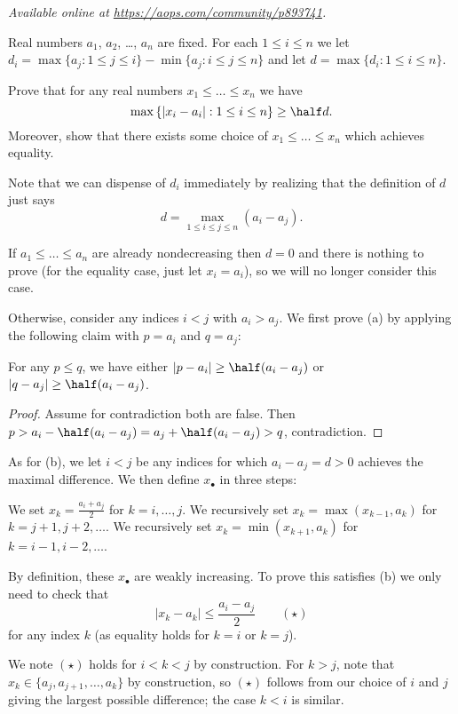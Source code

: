 \textsl{Available online at \url{https://aops.com/community/p893741}.}
\begin{mdframed}[style=mdpurplebox,frametitle={Problem statement}]
Real numbers $a_1$, $a_2$, \dots, $a_n$ are fixed.
For each $1 \le i \le n$ we let
$d_i = \max\{a_j : 1 \le j \le i\} - \min\{a_j : i \le j \le n\}$
and let $d = \max \{d_i : 1 \le i \le n\}$.

\begin{enumerate}[(a)]
  \ii Prove that for any real numbers $x_1 \le \dots \le x_n$ we have
  \[
    \max \left\{ \left\lvert x_i - a_i \right\rvert :
      1 \le i \le n \right\}
      \ge \half d.
  \]
  \ii Moreover, show that there exists some
  choice of $x_1 \le \dots \le x_n$ which achieves equality.
\end{enumerate}
\end{mdframed}
Note that we can dispense of $d_i$ immediately
by realizing that the definition of $d$ just says
\[ d = \max_{1 \le i \le j \le n} \left( a_i - a_j \right). \]

If $a_1 \le \dots \le a_n$ are already nondecreasing
then $d = 0$ and there is nothing to prove
(for the equality case, just let $x_i = a_i$),
so we will no longer consider this case.

Otherwise, consider any indices $i < j$ with $a_i > a_j$.
We first prove (a) by applying the following claim
with $p = a_i$ and $q = a_j$:
\begin{claim*}
  For any $p \le q$, we have
  either $|p - a_i| \ge \half(a_i-a_j)$
  or $|q - a_j| \ge \half(a_i-a_j)$.
\end{claim*}
\begin{proof}
  Assume for contradiction both are false.
  Then $p > a_i - \half(a_i-a_j)
  = a_j + \half(a_i-a_j) > q$, contradiction.
\end{proof}

As for (b), we let $i < j$ be any indices for which
$a_i - a_j = d > 0$ achieves the maximal difference.
We then define $x_\bullet$ in three steps:
\begin{itemize}
  \ii We set $x_k = \frac{a_i + a_j}{2}$ for $k = i, \dots, j$.
  \ii We recursively set $x_{k} = \max(x_{k-1}, a_k)$
  for $k = j+1, j+2, \dots$.
  \ii We recursively set $x_{k} = \min(x_{k+1}, a_k)$
  for $k = i-1, i-2, \dots$.
\end{itemize}
By definition, these $x_\bullet$ are weakly increasing.
To prove this satisfies (b) we only need to check that
\[ \left\lvert x_k - a_k \right\rvert \le \frac{a_i-a_j}{2} \qquad
  (\star) \]
for any index $k$ (as equality holds for $k = i$ or $k = j$).

We note $(\star)$ holds for $i < k < j$ by construction.
For $k > j$, note that $x_k \in \{a_j, a_{j+1}, \dots, a_k\}$
by construction, so $(\star)$ follows from our choice of $i$ and $j$
giving the largest possible difference; the case $k < i$ is similar.
\pagebreak